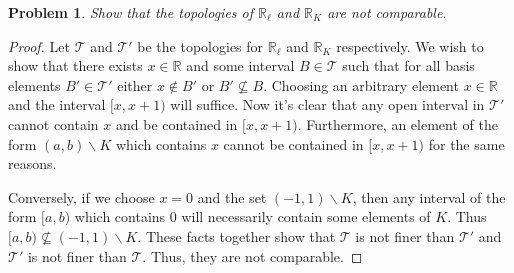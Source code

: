 \documentclass{article}
\newtheorem{problem}{Problem}
\begin{document}
\begin{problem}
\label{rlrk}
Show that the topologies of $\mathbb{R}_{\ell}$ and $\mathbb{R}_K$ are not comparable.
\end{problem}
\begin{proof}
Let $\mathcal{T}$ and $\mathcal{T}'$ be the topologies for $\mathbb{R}_{\ell}$ and $\mathbb{R}_K$ respectively. We wish to show that there exists $x \in \mathbb{R}$ and some interval $B \in \mathcal{T}$ such that for all basis elements $B' \in \mathcal{T}'$ either $x \notin B'$ or $B' \nsubseteq B$. Choosing an arbitrary element $x \in \mathbb{R}$ and the interval $[x, x+1)$ will suffice. Now it's clear that any open interval in $\mathcal{T}'$ cannot contain $x$ and be contained in $[x, x+1)$. Furthermore, an element of the form $(a,b) \backslash K$ which contains $x$ cannot be contained in $[x, x+1)$ for the same reasons.

Conversely, if we choose $x = 0$ and the set $(-1,1) \backslash K$, then any interval of the form $[a,b)$ which contains $0$ will necessarily contain some elements of $K$. Thus $[a,b) \nsubseteq (-1,1) \backslash K$. These facts together show that $\mathcal{T}$ is not finer than $\mathcal{T}'$ and $\mathcal{T}'$ is not finer than $\mathcal{T}$. Thus, they are not comparable.
\end{proof}
\end{document}
